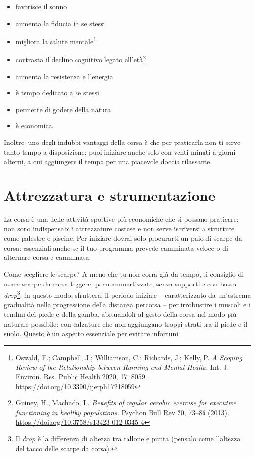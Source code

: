 \begin{itemize}
    \item favorisce il sonno
    \item aumenta la fiducia in se stessi
    \item migliora la salute mentale\footnote{
        Oswald, F.; Campbell, J.; Williamson, C.; Richards, J.; Kelly, P.
        \emph{A Scoping Review of the Relationship between Running and Mental
        Health.}
        Int. J. Environ. Res. Public Health 2020, 17, 8059.
        \url{https://doi.org/10.3390/ijerph17218059}
    }
    \item contrasta il declino cognitivo legato all'età\footnote{
        Guiney, H., Machado, L.
        \emph{Benefits of regular aerobic exercise for executive functioning in healthy populations.}
        Psychon Bull Rev 20, 73–86 (2013).
        \url{https://doi.org/10.3758/s13423-012-0345-4}
    }
    \item aumenta la resistenza e l'energia
    \item è tempo dedicato a se stessi
    \item permette di godere della natura
    \item è economica.
\end{itemize}

Inoltre, uno degli indubbi vantaggi della corsa è che
per praticarla non ti serve tanto tempo a disposizione:
puoi iniziare anche solo con venti minuti a giorni alterni,
a cui aggiungere il tempo per una piacevole doccia rilassante.

\chapter{Attrezzatura e strumentazione}
La corsa è una delle attività sportive più economiche che si possano praticare:
non sono indispensabili attrezzature costose
e non serve iscriversi a strutture come palestre e piscine.
Per iniziare dovrai solo procurarti un paio di scarpe da corsa:
essenziali anche se il tuo programma prevede
camminata veloce o di alternare corsa e camminata.

Come scegliere le scarpe?
A meno che tu non corra già da tempo, ti consiglio di usare scarpe da corsa
leggere, poco ammortizzate, senza supporti e con basso
\textit{drop}\footnote{Il \textit{drop} è la differenza di altezza tra
tallone e punta (pensalo come l'altezza del tacco delle scarpe da corsa).}.
In questo modo, sfrutterai il periodo iniziale -- caratterizzato da un'estrema
gradualità nella progressione della distanza percorsa -- 
per irrobustire
i muscoli e i tendini del piede e della gamba, abituandoli al gesto della corsa
nel modo più naturale possibile:
con calzature che non aggiungano troppi strati tra il piede e il suolo.
Questo è un aspetto essenziale per evitare infortuni.

